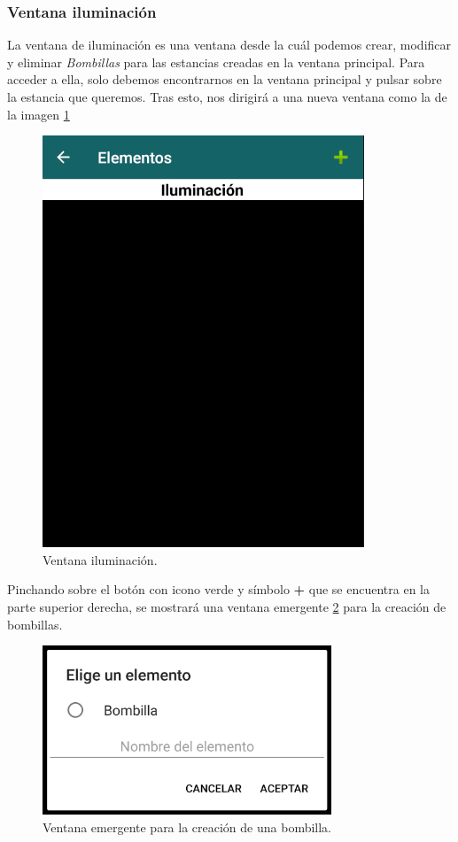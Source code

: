 \subsubsection{Ventana iluminación}

La ventana de iluminación es una ventana desde la cuál podemos crear, modificar y eliminar \textit{Bombillas} para las estancias creadas en la ventana principal. Para acceder a ella, solo debemos encontrarnos en la ventana principal y pulsar sobre la estancia que queremos. Tras esto, nos dirigirá a una nueva ventana como la de la imagen \ref{fig:ventanaIluminacion}

\begin{figure}[h!]
	\centering
	\includegraphics[width=0.6\linewidth]{img/ventanaIluminacion}
	\caption{Ventana iluminación.}
	\label{fig:ventanaIluminacion}
\end{figure}

Pinchando sobre el botón con icono verde y símbolo \textbf{+} que se encuentra en la parte superior derecha, se mostrará una ventana emergente \ref{fig:ventanaEmergenteBombilla} para la creación de bombillas. 

\begin{figure}[h!]
	\centering
	\includegraphics[width=0.6\linewidth]{img/ventanaEmergenteBombilla}
	\caption{Ventana emergente para la creación de una bombilla.}
	\label{fig:ventanaEmergenteBombilla}
\end{figure}

